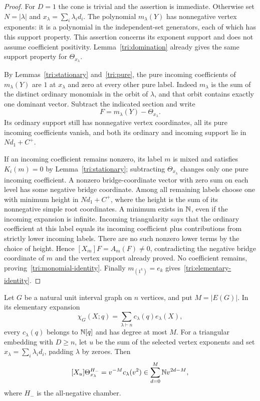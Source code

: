 \begin{proof}
For $D=1$ the cone is trivial and the assertion is immediate.
Otherwise set $N=|\lambda|$ and $x_\lambda=\sum_i\lambda_i d_i$.
The polynomial $m_\lambda(Y)$ has nonnegative vertex exponents:
it is a polynomial in the independent-set generators, each of
which has this support property.  This assertion concerns its
exponent support and does not assume coefficient positivity.
Lemma~\ref{tri:domination} already gives the same support property
for $\Theta_{x_\lambda}$.

By Lemmas~\ref{tri:stationary} and~\ref{tri:pure}, the pure
incoming coefficients of $m_\lambda(Y)$ are $1$ at $x_\lambda$
and zero at every other pure label.  Indeed $m_\lambda$ is the
sum of the distinct ordinary monomials in the orbit of $\lambda$,
and that orbit contains exactly one dominant vector.
Subtract the indicated section and write
\[
 F=m_\lambda(Y)-\Theta_{x_\lambda}.
\]
Its ordinary support still has nonnegative vertex coordinates,
all its pure incoming coefficients vanish, and both its ordinary
and incoming support lie in $Nd_1+C^+$.

If an incoming coefficient remains nonzero, its label $m$ is
mixed and satisfies $K_i(m)=0$ by Lemma~\ref{tri:stationary};
subtracting $\Theta_{x_\lambda}$ changes only one pure incoming
coefficient.  A nonzero bridge-coordinate vector with zero sum
on each level has some negative bridge coordinate.
Among all remaining labels choose one with minimum height in
$Nd_1+C^+$, where the height is the sum of its nonnegative simple
root coordinates.  A minimum exists in $\mathbb N$, even if the incoming
expansion is infinite.  Incoming triangularity says that the
ordinary coefficient at this label equals its incoming
coefficient plus contributions from strictly lower incoming
labels.  There are no such nonzero lower terms by the choice of
height.  Hence $[X_m]F=A_m(F)\ne0$, contradicting the negative
bridge coordinate of $m$ and the vertex support already proved.
No coefficient remains, proving~\eqref{tri:monomial-identity}.
Finally $m_{(1^k)}=e_k$ gives~\eqref{tri:elementary-identity}.
\end{proof}


\begin{corollary}\label{tri:positivity}
Let $G$ be a natural unit interval graph on $n$ vertices, and put
$M=|E(G)|$.  In its elementary expansion
\[
 \chi_G(X;q)=\sum_{\lambda\vdash n}c_\lambda(q)e_\lambda(X),
\]
every $c_\lambda(q)$ belongs to $\mathbb N[q]$ and has degree at most $M$.
For a triangular embedding with $D\geq n$, let $u$ be the sum of the
selected vertex exponents and set $x_\lambda=\sum_i\lambda_i d_i$,
padding $\lambda$ by zeroes.  Then
\begin{equation}\label{tri:positive-coefficient}
 [X_u]\Theta_{x_\lambda}^{H_-}
   =v^{-M}c_\lambda(v^2)
   \in\sum_{d=0}^{M}\mathbb N v^{2d-M},
\end{equation}
where $H_-$ is the all-negative chamber.
\end{corollary}

